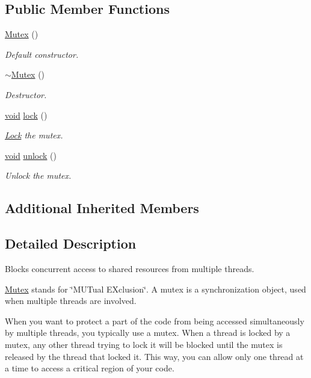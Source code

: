 \subsection*{Public Member Functions}
\begin{DoxyCompactItemize}
\item 
\hyperlink{classsf_1_1_mutex_a9bd52a48320fd7b6db8a78037aad276e}{Mutex} ()
\begin{DoxyCompactList}\small\item\em Default constructor. \end{DoxyCompactList}\item 
\hyperlink{classsf_1_1_mutex_a9f76a67b7b6d3918131a692179b4e3f2}{$\sim$\-Mutex} ()
\begin{DoxyCompactList}\small\item\em Destructor. \end{DoxyCompactList}\item 
\hyperlink{glutf90_8h_ac778d6f63f1aaf8ebda0ce6ac821b56e}{void} \hyperlink{classsf_1_1_mutex_a1a16956a6bbea764480c1b80f2e45763}{lock} ()
\begin{DoxyCompactList}\small\item\em \hyperlink{classsf_1_1_lock}{Lock} the mutex. \end{DoxyCompactList}\item 
\hyperlink{glutf90_8h_ac778d6f63f1aaf8ebda0ce6ac821b56e}{void} \hyperlink{classsf_1_1_mutex_ade71268ffc5e80756652058b01c23c33}{unlock} ()
\begin{DoxyCompactList}\small\item\em Unlock the mutex. \end{DoxyCompactList}\end{DoxyCompactItemize}
\subsection*{Additional Inherited Members}


\subsection{Detailed Description}
Blocks concurrent access to shared resources from multiple threads. 

\hyperlink{classsf_1_1_mutex}{Mutex} stands for \char`\"{}\-M\-U\-Tual E\-Xclusion\char`\"{}. A mutex is a synchronization object, used when multiple threads are involved.

When you want to protect a part of the code from being accessed simultaneously by multiple threads, you typically use a mutex. When a thread is locked by a mutex, any other thread trying to lock it will be blocked until the mutex is released by the thread that locked it. This way, you can allow only one thread at a time to access a critical region of your code.

